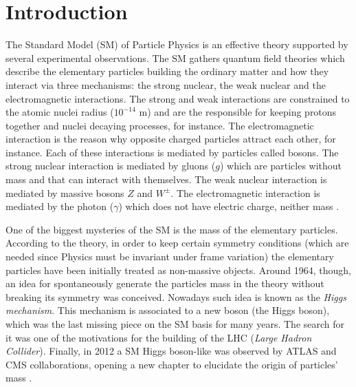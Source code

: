 \chapter*{Introduction}
The Standard Model (SM) of Particle Physics is an effective theory supported by several experimental observations. The SM gathers quantum field theories which describe the elementary particles building the ordinary matter and how they interact via three mechanisms: the strong nuclear, the weak nuclear and the electromagnetic interactions. The strong and weak interactions are constrained to the atomic nuclei radius ($10^{-14}$ m) and are the responsible for keeping protons together and nuclei decaying processes, for instance. The electromagnetic interaction is the reason why opposite charged particles attract each other, for instance. Each of these interactions is mediated by particles called bosons. The strong nuclear interaction is mediated by gluons ($g$) which are particles without mass and that can interact with themselves. The weak nuclear interaction is mediated by massive bosons $Z$ and $W^{\pm}$. The electromagnetic interaction is mediated by the photon ($\gamma$) which does not have electric charge, neither mass \cite{bib:whitbeck-2013, bib:brachem-2012, bib:griffiths-2008, bib:halzen-martin-1984}.

One of the biggest mysteries of the SM is the mass of the elementary particles. According to the theory, in order to keep certain symmetry conditions (which are needed since Physics must be invariant under frame variation) the elementary particles have been initially treated as non-massive objects. Around 1964, though, an idea for spontaneously generate the particles mass in the theory without breaking its symmetry was conceived. Nowadays such idea is known as the \textit{Higgs mechanism}. This mechanism is associated to a new boson (the Higgs boson), which was the last missing piece on the SM basis for many years. The search for it was one of the motivations for the building of the LHC (\textit{Large Hadron Collider}). Finally, in 2012 a SM Higgs boson-like was observed by ATLAS and CMS collaborations, opening a new chapter to elucidate the origin of particles' mass \cite{bib:whitbeck-2013, bib:brachem-2012, bib:griffiths-2008, bib:halzen-martin-1984}.

